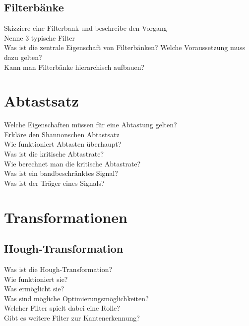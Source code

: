 \subsection{Filterbänke}
\begin{description}
	\item[Skizziere eine Filterbank und beschreibe den Vorgang]
	\item[Nenne 3 typische Filter]
	\item[Was ist die zentrale Eigenschaft von Filterbänken? Welche Voraussetzung muss dazu gelten?]
	\item[Kann man Filterbänke hierarchisch aufbauen?]
\end{description}
\section{Abtastsatz}
\begin{description}
	\item[Welche Eigenschaften müssen für eine Abtastung gelten?]
	\item[Erkläre den Shannonschen Abtastsatz]
	\item[Wie funktioniert Abtasten überhaupt?]
	\item[Was ist die kritische Abtastrate?]
	\item[Wie berechnet man die kritische Abtastrate?]
	\item[Was ist ein bandbeschränktes Signal?]
	\item[Was ist der Träger eines Signals?]
	\end{description}
\section{Transformationen}
\subsection{Hough-Transformation}
\begin{description}
	\item[Was ist die Hough-Transformation?]
	\item[Wie funktioniert sie?]
	\item[Was ermöglicht sie?]
    \item[Was sind mögliche Optimierungsmöglichkeiten?]
	\item[Welcher Filter spielt dabei eine Rolle?]
	\item[Gibt es weitere Filter zur Kantenerkennung?]
\end{description}

